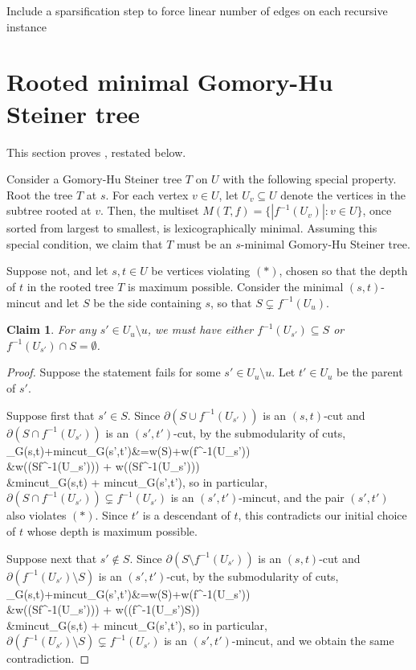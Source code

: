 \documentclass{article}
\newcommand{\sm}{\setminus}
\newcommand{\s}{\subseteq}
\def\BAL#1\EAL{\begin{align*}#1\end{align*}}
\newcommand{\inv}{^{-1}}
\newcommand{\pt}{\partial}
\newcommand{\1}{\mathbbm 1}
\newtheorem{claim}[theorem]{Claim}
\newcommand{\BCL}{\begin{claim}}
\newcommand{\ECL}{\end{claim}}
\newcommand{\BP}{\begin{proof}}
\newcommand{\EP}{\end{proof}}
\newcommand{\thm}[1]{\Cref{thm:#1}}
\newcommand{\clml}[1]{\label{clm:#1}}
\newcommand{\mincut}{\textsf{\textup{mincut}}}
\begin{document}
Include a sparsification step to force linear number of edges on each recursive instance







\appendix

\section{Rooted minimal Gomory-Hu Steiner tree}

This section proves \thm{rooted}, restated below.
\Rooted*

Consider a Gomory-Hu Steiner tree $T$ on $U$ with the following special property. Root the tree $T$ at $s$. For each vertex $v\in U$, let $U_v\s U$ denote the vertices in the subtree rooted at $v$. Then, the multiset $M(T,f)=\{ |f\inv(U_v)| : v\in U\}$, once sorted from largest to smallest, is lexicographically minimal. Assuming this special condition, we claim that $T$ must be an $s$-minimal Gomory-Hu Steiner tree.

Suppose not, and let $s,t\in U$ be vertices violating $(*)$, chosen so that the depth of $t$ in the rooted tree $T$ is maximum possible. Consider the minimal $(s,t)$-mincut and let $S$ be the side containing $s$, so that $S\subsetneq f\inv(U_u)$.

\BCL\clml{Us}
For any $s'\in U_u\sm u$, we must have either $f\inv(U_{s'})\s S$ or $f\inv(U_{s'})\cap S=\emptyset$.
\ECL
\BP
Suppose the statement fails for some $s'\in U_u\sm u$. Let $t'\in U_u$ be the parent of $s'$.

Suppose first that $s'\in S$. Since $\pt(S\cup f\inv(U_{s'}))$ is an $(s,t)$-cut and $\pt(S\cap f\inv(U_{s'}))$ is an $(s',t')$-cut, by the submodularity of cuts,
\BAL
\mincut_G(s,t)+\mincut_G(s',t')&=w(\pt S)+w(\pt f\inv(U_{s'})) 
\\&\ge w(\pt(S\cup f\inv(U_{s'}))) + w(\pt(S\cap f\inv(U_{s'}))) 
\\&\ge \mincut_G(s,t) + \mincut_G(s',t'),
\EAL
so in particular, $\pt(S\cap f\inv(U_{s'})) \subsetneq f\inv(U_{s'})$ is an $(s',t')$-mincut, and the pair $(s',t')$ also violates $(*)$. Since $t'$ is a descendant of $t$, this contradicts our initial choice of $t$ whose depth is maximum possible.

Suppose next that $s'\notin S$. Since $\pt(S\sm f\inv(U_{s'}))$ is an $(s,t)$-cut and $\pt(f\inv(U_{s'})\sm S)$ is an $(s',t')$-cut, by the submodularity of cuts,
\BAL
\mincut_G(s,t)+\mincut_G(s',t')&=w(\pt S)+w(\pt f\inv(U_{s'})) 
\\&\ge w(\pt(S\sm f\inv(U_{s'}))) + w(\pt(f\inv(U_{s'})\sm S)) 
\\&\ge \mincut_G(s,t) + \mincut_G(s',t'),
\EAL
so in particular, $\pt(f\inv(U_{s'})\sm S)\subsetneq f\inv(U_{s'})$ is an $(s',t')$-mincut, and we obtain the same contradiction.
\EP
\end{document}
